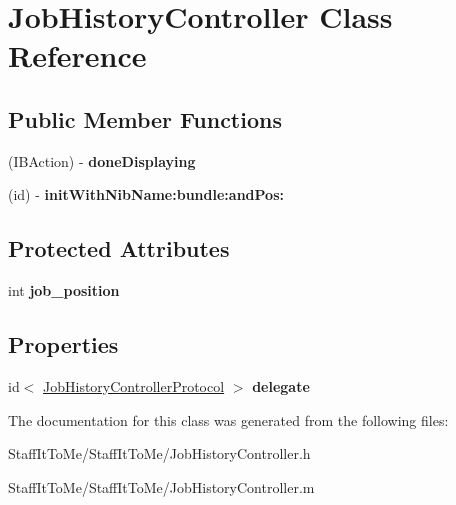\hypertarget{interface_job_history_controller}{
\section{\-Job\-History\-Controller \-Class \-Reference}
\label{interface_job_history_controller}
}
\subsection*{\-Public \-Member \-Functions}
\begin{DoxyCompactItemize}
\item 
\hypertarget{interface_job_history_controller_a7aae7702330d822218016b483729bd70}{
(\-I\-B\-Action) -\/ {\bfseries done\-Displaying}}
\label{interface_job_history_controller_a7aae7702330d822218016b483729bd70}

\item 
\hypertarget{interface_job_history_controller_ade257957cd5dc36da218e5deaa37d5f0}{
(id) -\/ {\bfseries init\-With\-Nib\-Name\-:bundle\-:and\-Pos\-:}}
\label{interface_job_history_controller_ade257957cd5dc36da218e5deaa37d5f0}

\end{DoxyCompactItemize}
\subsection*{\-Protected \-Attributes}
\begin{DoxyCompactItemize}
\item 
\hypertarget{interface_job_history_controller_aeefb4f661cfcc6bdcbe1a113426a85b1}{
int {\bfseries job\-\_\-position}}
\label{interface_job_history_controller_aeefb4f661cfcc6bdcbe1a113426a85b1}

\end{DoxyCompactItemize}
\subsection*{\-Properties}
\begin{DoxyCompactItemize}
\item 
\hypertarget{interface_job_history_controller_ac21e7f3d9894c57f63daa1eeebd7765d}{
id$<$ \hyperlink{protocol_job_history_controller_protocol-p}{\-Job\-History\-Controller\-Protocol} $>$ {\bfseries delegate}}
\label{interface_job_history_controller_ac21e7f3d9894c57f63daa1eeebd7765d}

\end{DoxyCompactItemize}


\-The documentation for this class was generated from the following files\-:\begin{DoxyCompactItemize}
\item 
\-Staff\-It\-To\-Me/\-Staff\-It\-To\-Me/\-Job\-History\-Controller.\-h\item 
\-Staff\-It\-To\-Me/\-Staff\-It\-To\-Me/\-Job\-History\-Controller.\-m\end{DoxyCompactItemize}
